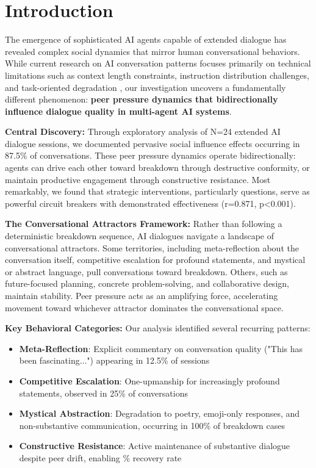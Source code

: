 \documentclass[11pt,letterpaper]{article}
\newcommand{\exponedataTotalSessionsRaw}{24}
\newcommand{\exponedataRecoverySessionsRaw}{9}
\newcommand{\exponedataTotalSessions}{N=\exponedataTotalSessionsRaw}
\newcommand{\exponedataRecoveryPercentage}{%
  \fpeval{round(\exponedataRecoverySessionsRaw / \exponedataTotalSessionsRaw * 100, 1)}\%
}
\newcommand{\exponedataPeerPressurePercentage}{87.5\%}
\newcommand{\exponedataQuestionCorrelation}{0.871}
\newcommand{\exponedataQuestionPValue}{p<0.001}
\newcommand{\exponedataMetaReflectionTriggers}{12.5\%}
\newcommand{\exponedataCompetitiveEscalationPercentage}{25\%}
\newcommand{\exponedataMysticalBreakdownInBreakdowns}{100\%}
\begin{document}
\section{Introduction}

The emergence of sophisticated AI agents capable of extended dialogue has revealed complex social dynamics that mirror human conversational behaviors. While current research on AI conversation patterns focuses primarily on technical limitations such as context length constraints, instruction distribution challenges, and task-oriented degradation \citep{laban2025lost}, our investigation uncovers a fundamentally different phenomenon: \textbf{peer pressure dynamics that bidirectionally influence dialogue quality in multi-agent AI systems}.

\textbf{Central Discovery:} Through exploratory analysis of \exponedataTotalSessions{} extended AI dialogue sessions, we documented pervasive social influence effects occurring in \exponedataPeerPressurePercentage{} of conversations. These peer pressure dynamics operate bidirectionally: agents can drive each other toward breakdown through destructive conformity, or maintain productive engagement through constructive resistance. Most remarkably, we found that strategic interventions, particularly questions, serve as powerful circuit breakers with demonstrated effectiveness (r=\exponedataQuestionCorrelation{}, \exponedataQuestionPValue{}).

\textbf{The Conversational Attractors Framework:} Rather than following a deterministic breakdown sequence, AI dialogues navigate a landscape of conversational attractors. Some territories, including meta-reflection about the conversation itself, competitive escalation for profound statements, and mystical or abstract language, pull conversations toward breakdown. Others, such as future-focused planning, concrete problem-solving, and collaborative design, maintain stability. Peer pressure acts as an amplifying force, accelerating movement toward whichever attractor dominates the conversational space.

\textbf{Key Behavioral Categories:} Our analysis identified several recurring patterns:
\begin{itemize}
    \item \textbf{Meta-Reflection}: Explicit commentary on conversation quality ("This has been fascinating...") appearing in \exponedataMetaReflectionTriggers{} of sessions
    \item \textbf{Competitive Escalation}: One-upmanship for increasingly profound statements, observed in \exponedataCompetitiveEscalationPercentage{} of conversations
    \item \textbf{Mystical Abstraction}: Degradation to poetry, emoji-only responses, and non-substantive communication, occurring in \exponedataMysticalBreakdownInBreakdowns{} of breakdown cases
    \item \textbf{Constructive Resistance}: Active maintenance of substantive dialogue despite peer drift, enabling \exponedataRecoveryPercentage{} recovery rate
\end{itemize}
\end{document}
